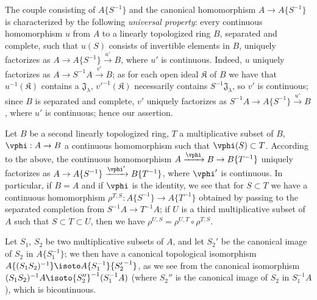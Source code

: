 \begin{env}[7.6.6]
\label{0.7.6.6}
The couple consisting of $A\{S^{-1}\}$ and the canonical homomorphism $A\to A\{S^{-1}\}$ is
characterized by the following \emph{universal property}: every continuous homomorphism $u$ from
$A$ to a linearly topologized ring $B$, separated and complete, such that $u(S)$ consists of
invertible elements in $B$, uniquely factorizes as $A\to A\{S^{-1}\}\xrightarrow{u'}B$, where
$u'$ is continuous. Indeed, $u$ uniquely factorizes as $A\to S^{-1}A\xrightarrow{v'}B$; as for
each open ideal $\mathfrak{K}$ of $B$ we have that $u^{-1}(\mathfrak{K})$ contains a
$\mathfrak{J}_\lambda$, ${v'}^{-1}(\mathfrak{K})$ necessarily contains $S^{-1}\mathfrak{J}_\lambda$,
so $v'$ is continuous; since $B$ is separated and complete, $v'$ uniquely factorizes as
$S^{-1}A\to A\{S^{-1}\}\xrightarrow{u'}B$, where $u'$ is continuous; hence our assertion.
\end{env}

\begin{env}[7.6.7]
\label{0.7.6.7}
Let $B$ be a second linearly topologized ring, $T$ a multiplicative subset of $B$,
$\vphi:A\to B$ a continuous homomorphism such that $\vphi(S)\subset T$. According to the above,
the continuous homomorphism $A\xrightarrow{\vphi}B\to B\{T^{-1}\}$ uniquely factorizes as
$A\to A\{S^{-1}\}\xrightarrow{\vphi'}B\{T^{-1}\}$, where $\vphi'$ is continuous. In particular,
if $B=A$ and if $\vphi$ is the identity, we see that for $S\subset T$ we have a continuous
homomorphism $\rho^{T,S}:A\{S^{-1}\}\to A\{T^{-1}\}$ obtained by passing to the separated completion
from $S^{-1}A\to T^{-1}A$; if $U$ is a third multiplicative subset of $A$ such that
$S\subset T\subset U$, then we have $\rho^{U,S}=\rho^{U,T}\circ\rho^{T,S}$.
\end{env}

\begin{env}[7.6.8]
\label{0.7.6.8}
Let $S_1$, $S_2$ be two multiplicative subsets of $A$, and let $S_2'$ be the canonical image of
$S_2$ in $A\{S_1^{-1}\}$; we then have a canonical topological isomorphism
$A\{(S_1 S_2)^{-1}\}\isoto A\{S_1^{-1}\}\{{S_2'}^{-1}\}$, as we see from the canonical isomorphism
$(S_1 S_2)^{-1}A\isoto{S_2''}^{-1}(S_1^{-1}A)$ (where $S_2''$ is the canonical image of $S_2$ in
$S_1^{-1}A$), which is bicontinuous.
\end{env}

